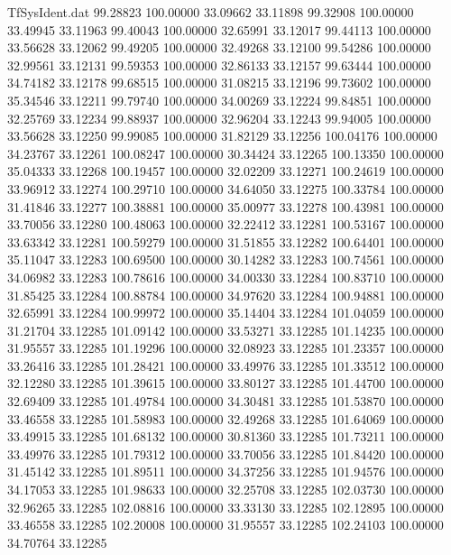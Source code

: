 \begin{filecontents}{TfSysIdent.dat}
  99.28823  100.00000   33.09662   33.11898
  99.32908  100.00000   33.49945   33.11963
  99.40043  100.00000   32.65991   33.12017
  99.44113  100.00000   33.56628   33.12062
  99.49205  100.00000   32.49268   33.12100
  99.54286  100.00000   32.99561   33.12131
  99.59353  100.00000   32.86133   33.12157
  99.63444  100.00000   34.74182   33.12178
  99.68515  100.00000   31.08215   33.12196
  99.73602  100.00000   35.34546   33.12211
  99.79740  100.00000   34.00269   33.12224
  99.84851  100.00000   32.25769   33.12234
  99.88937  100.00000   32.96204   33.12243
  99.94005  100.00000   33.56628   33.12250
  99.99085  100.00000   31.82129   33.12256
 100.04176  100.00000   34.23767   33.12261
 100.08247  100.00000   30.34424   33.12265
 100.13350  100.00000   35.04333   33.12268
 100.19457  100.00000   32.02209   33.12271
 100.24619  100.00000   33.96912   33.12274
 100.29710  100.00000   34.64050   33.12275
 100.33784  100.00000   31.41846   33.12277
 100.38881  100.00000   35.00977   33.12278
 100.43981  100.00000   33.70056   33.12280
 100.48063  100.00000   32.22412   33.12281
 100.53167  100.00000   33.63342   33.12281
 100.59279  100.00000   31.51855   33.12282
 100.64401  100.00000   35.11047   33.12283
 100.69500  100.00000   30.14282   33.12283
 100.74561  100.00000   34.06982   33.12283
 100.78616  100.00000   34.00330   33.12284
 100.83710  100.00000   31.85425   33.12284
 100.88784  100.00000   34.97620   33.12284
 100.94881  100.00000   32.65991   33.12284
 100.99972  100.00000   35.14404   33.12284
 101.04059  100.00000   31.21704   33.12285
 101.09142  100.00000   33.53271   33.12285
 101.14235  100.00000   31.95557   33.12285
 101.19296  100.00000   32.08923   33.12285
 101.23357  100.00000   33.26416   33.12285
 101.28421  100.00000   33.49976   33.12285
 101.33512  100.00000   32.12280   33.12285
 101.39615  100.00000   33.80127   33.12285
 101.44700  100.00000   32.69409   33.12285
 101.49784  100.00000   34.30481   33.12285
 101.53870  100.00000   33.46558   33.12285
 101.58983  100.00000   32.49268   33.12285
 101.64069  100.00000   33.49915   33.12285
 101.68132  100.00000   30.81360   33.12285
 101.73211  100.00000   33.49976   33.12285
 101.79312  100.00000   33.70056   33.12285
 101.84420  100.00000   31.45142   33.12285
 101.89511  100.00000   34.37256   33.12285
 101.94576  100.00000   34.17053   33.12285
 101.98633  100.00000   32.25708   33.12285
 102.03730  100.00000   32.96265   33.12285
 102.08816  100.00000   33.33130   33.12285
 102.12895  100.00000   33.46558   33.12285
 102.20008  100.00000   31.95557   33.12285
 102.24103  100.00000   34.70764   33.12285

\end{filecontents}
